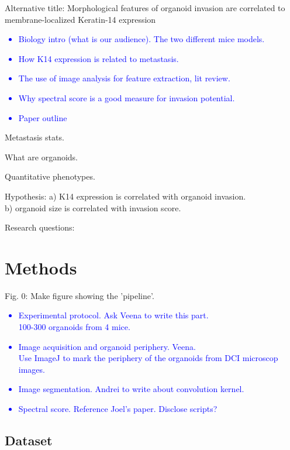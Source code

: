 \documentclass[runningheads]{llncs}
\begin{document}
Alternative title: Morphological features of organoid invasion are correlated to membrane-localized Keratin-14 expression

\textcolor{blue}{
\begin{itemize}
    \item Biology intro (what is our audience). The two different mice models.
    \item How K14 expression is related to metastasis.
    \item The use of image analysis for feature extraction, lit review.
    \item Why spectral score is a good measure for invasion potential.
    \item Paper outline
\end{itemize}
}

Metastasis stats.

What are organoids.

Quantitative phenotypes.


Hypothesis: a) K14 expression is correlated with organoid invasion.\\
b) organoid size is correlated with invasion score.

Research questions:


\section {Methods}

Fig. 0: Make figure showing the 'pipeline'.

\textcolor{blue}{
\begin{itemize}
    \item Experimental protocol. Ask Veena to write this part.\\ 
        100-300 organoids from 4 mice.
    \item Image acquisition and organoid periphery. Veena.\\
        Use ImageJ to mark the periphery of the organoids from DCI microscop images.
    \item Image segmentation. Andrei to write about convolution kernel.
    \item Spectral score. Reference Joel's paper. Disclose scripts?
\end{itemize}
}

\subsection{Dataset}
\end{document}
